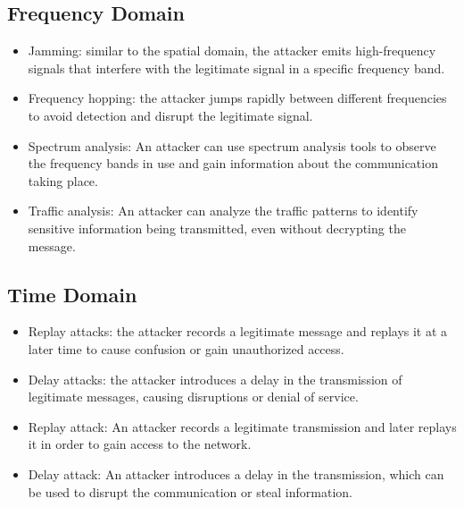 \documentclass[conference]{IEEEtran}
\begin{document}
\subsection{Frequency Domain}
\begin{itemize}
    \item Jamming: similar to the spatial domain, the attacker emits high-frequency signals that interfere with the legitimate signal in a specific frequency band.
    \item Frequency hopping: the attacker jumps rapidly between different frequencies to avoid detection and disrupt the legitimate signal.
    \item Spectrum analysis: An attacker can use spectrum analysis tools to observe the frequency bands in use and gain information about the communication taking place.
    \item Traffic analysis: An attacker can analyze the traffic patterns to identify sensitive information being transmitted, even without decrypting the message.


\end{itemize}

\subsection{Time Domain}
\begin{itemize}
    \item Replay attacks: the attacker records a legitimate message and replays it at a later time to cause confusion or gain unauthorized access.
    \item Delay attacks: the attacker introduces a delay in the transmission of legitimate messages, causing disruptions or denial of service.
    \item Replay attack: An attacker records a legitimate transmission and later replays it in order to gain access to the network.
    \item Delay attack: An attacker introduces a delay in the transmission, which can be used to disrupt the communication or steal information.
\end{itemize}

\begin{table}[htbp]
\caption{Classification of Attacks}
\begin{center}
\label{tab1}
\end{center}
\end{table}
\end{document}
